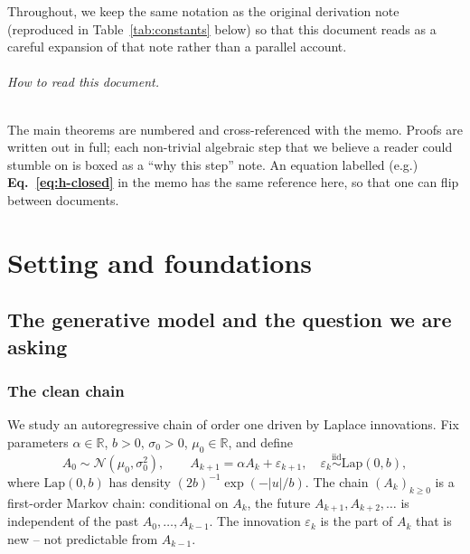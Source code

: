 \documentclass[11pt,a4paper,openany]{book}
\theoremstyle{plainserif}
\theoremstyle{definition}
\theoremstyle{remarkstyle}
\newcommand{\R}{\mathbb{R}}
\newcommand{\Normal}{\mathcal{N}}
\newcommand{\Lap}{\mathrm{Lap}}
\begin{document}
Throughout, we keep the same notation as the original derivation
note~\cite{laplace_note} (reproduced in Table~\ref{tab:constants} below)
so that this document reads as a careful expansion of that note rather
than a parallel account.

\paragraph{How to read this document.}
The main theorems are numbered and cross-referenced with the memo.
Proofs are written out in full; each non-trivial algebraic step that we
believe a reader could stumble on is boxed as a ``why this step'' note.
An equation labelled (e.g.) \textbf{Eq.~\eqref{eq:h-closed}} in the memo
has the same reference here, so that one can flip between documents.

\tableofcontents

\mainmatter

\part{Setting and foundations}

\chapter{The generative model and the question we are asking}
\label{ch:setting}

\section{The clean chain}

We study an autoregressive chain of order one driven by Laplace
innovations. Fix parameters $\alpha \in \R$, $b > 0$, $\sigma_0 > 0$,
$\mu_0 \in \R$, and define
\begin{equation}
A_0 \sim \Normal(\mu_0, \sigma_0^2), \qquad
A_{k+1} = \alpha A_k + \varepsilon_{k+1},\quad
\varepsilon_k \stackrel{\mathrm{iid}}{\sim} \Lap(0, b),
\label{eq:clean-chain}
\end{equation}
where $\Lap(0,b)$ has density $(2b)^{-1}\exp(-|u|/b)$. The chain
$(A_k)_{k\geq 0}$ is a first-order Markov chain: conditional on $A_k$, the
future $A_{k+1}, A_{k+2}, \ldots$ is independent of the past
$A_0, \ldots, A_{k-1}$. The innovation $\varepsilon_k$ is the part of
$A_k$ that is new -- not predictable from $A_{k-1}$.
\end{document}
